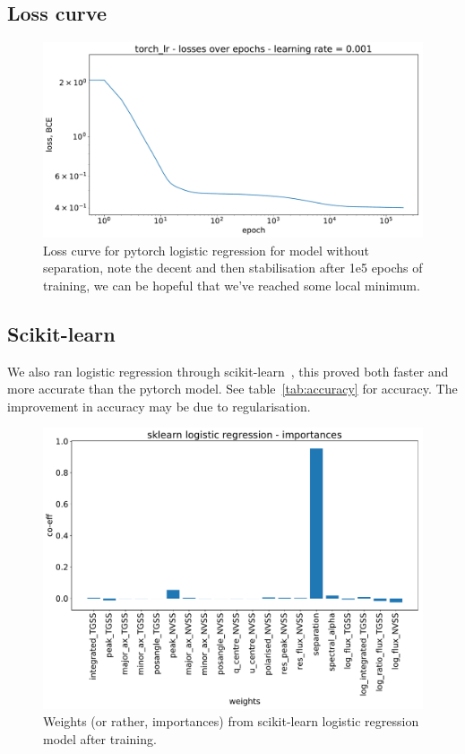 \documentclass[12pt,a4paper]{article}
\begin{document}
\subsection{Loss curve}
\label{app:losses}
\begin{figure}[H]
    \centering
    \includegraphics[width=\textwidth]{pics/torch_lr_losses_nosep.pdf}
    \caption{Loss curve for pytorch logistic regression for model without separation, note the decent and then stabilisation after 1e5 epochs of training, we can be hopeful that we've reached some local minimum.}
    \label{fig:torch_lr_losses_nosep}
\end{figure}

\newpage
\subsection{Scikit-learn}
\label{app:sklearn}

We also ran logistic regression through scikit-learn~\citep{sklearn}, this proved both faster and more accurate than the pytorch model. See table~\ref{tab:accuracy} for accuracy. The improvement in accuracy may be due to regularisation.

\begin{figure}[H]
    \centering
    \includegraphics[width=\textwidth]{pics/sklearn_lr.pdf}
    \caption{Weights (or rather, importances) from scikit-learn logistic regression model after training.}
    \label{fig:sklearn_lr}
\end{figure}
\end{document}

